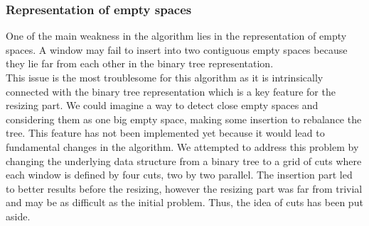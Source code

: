 \documentclass{acmtog}
\begin{document}
 \subsubsection{Representation of empty spaces}
One of the main weakness in the algorithm lies in the representation of empty spaces. A window may fail to insert into two contiguous empty spaces because they lie far from each other in the binary tree representation. \\
This issue is the most troublesome for this algorithm as it is intrinsically connected with the binary tree representation which is a key feature for the resizing part. We could imagine a way to detect close empty spaces and considering them as one big empty space, making some insertion to rebalance the tree. This feature has not been implemented yet because it would lead to fundamental changes in the algorithm. We attempted to  address this problem by changing the underlying data structure from a binary tree to a grid of cuts where each window is defined by four cuts, two by two parallel. The insertion part led to better results before the resizing, however the resizing part was far from trivial and may be as difficult as the initial problem. Thus, the idea of cuts has been put aside.
\end{document}
